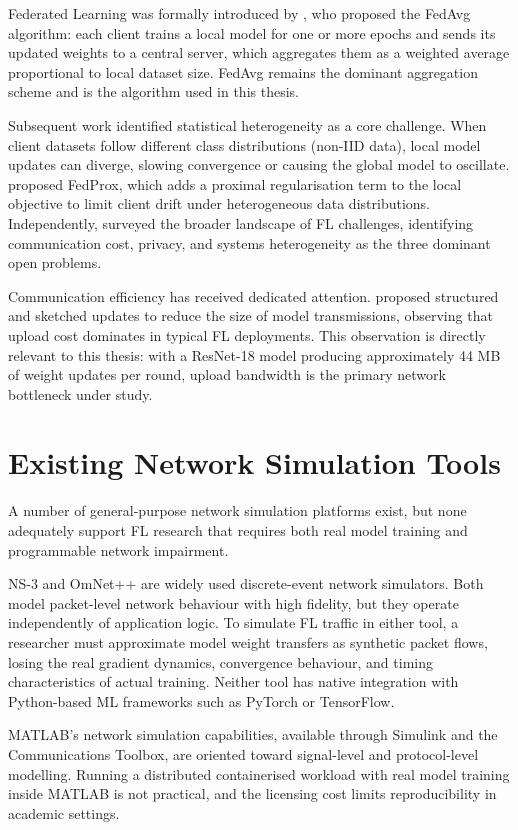 \documentclass[12pt,a4paper]{report}
\begin{document}
Federated Learning was formally introduced by \citet{mcmahan2017communication},
who proposed the FedAvg algorithm: each client trains a local model for one or more
epochs and sends its updated weights to a central server, which aggregates them as a
weighted average proportional to local dataset size. FedAvg remains the dominant
aggregation scheme and is the algorithm used in this thesis.

Subsequent work identified statistical heterogeneity as a core challenge. When client
datasets follow different class distributions (non-IID data), local model updates can
diverge, slowing convergence or causing the global model to oscillate.
\citet{li2020fedprox} proposed FedProx, which adds a proximal regularisation term to
the local objective to limit client drift under heterogeneous data distributions.
Independently, \citet{li2020federated} surveyed the broader landscape of FL
challenges, identifying communication cost, privacy, and systems heterogeneity as the
three dominant open problems.

Communication efficiency has received dedicated attention. \citet{konevcny2016federated} proposed structured and sketched updates to reduce the
size of model transmissions, observing that upload cost dominates in typical FL
deployments. This observation is directly relevant to this thesis: with a ResNet-18
model producing approximately 44 MB of weight updates per round, upload bandwidth
is the primary network bottleneck under study.

\section{Existing Network Simulation Tools}

A number of general-purpose network simulation platforms exist, but none adequately
support FL research that requires both real model training and programmable network
impairment.

NS-3 \citep{ns3} and OmNet++ \citep{omnetpp} are widely used discrete-event network
simulators. Both model packet-level network behaviour with high fidelity, but they
operate independently of application logic. To simulate FL traffic in either tool, a
researcher must approximate model weight transfers as synthetic packet flows, losing
the real gradient dynamics, convergence behaviour, and timing characteristics of actual
training. Neither tool has native integration with Python-based ML frameworks such as
PyTorch or TensorFlow.

MATLAB's network simulation capabilities, available through Simulink and the
Communications Toolbox, are oriented toward signal-level and protocol-level modelling.
Running a distributed containerised workload with real model training inside MATLAB is
not practical, and the licensing cost limits reproducibility in academic settings.
\end{document}
